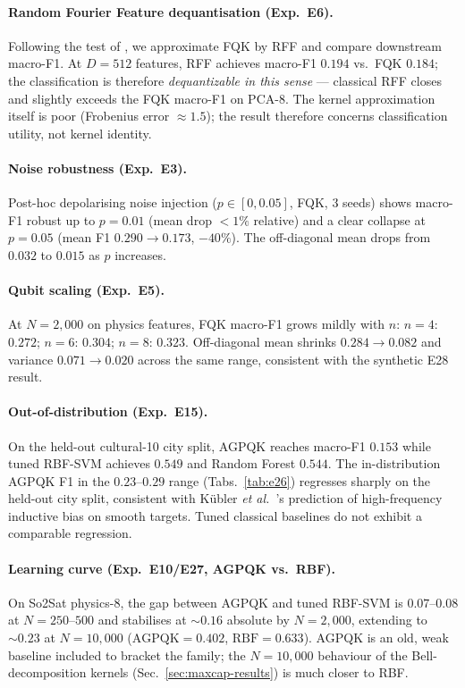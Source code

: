 \documentclass[pdflatex,sn-mathphys-num]{sn-jnl}
\theoremstyle{thmstyleone}
\theoremstyle{thmstyletwo}
\theoremstyle{thmstylethree}
\begin{document}
\paragraph{Random Fourier Feature dequantisation (Exp.\ E6).}
\label{sec:rff}
Following the test of \cite{huang2021}, we approximate FQK by RFF
\cite{rahimi2007} and compare downstream macro-F1. At $D=512$
features, RFF achieves macro-F1 $0.194$ vs.\ FQK $0.184$; the
classification is therefore \emph{dequantizable in this sense} ---
classical RFF closes and slightly exceeds the FQK macro-F1 on PCA-8.
The kernel approximation itself is poor (Frobenius error $\!\approx\!1.5$);
the result therefore concerns classification utility, not kernel
identity.

\paragraph{Noise robustness (Exp.\ E3).}
Post-hoc depolarising noise injection ($p\in [0,0.05]$, FQK, 3 seeds)
shows macro-F1 robust up to $p=0.01$ (mean drop $<\!1\%$ relative)
and a clear collapse at $p=0.05$ (mean F1 $0.290\to 0.173$,
$-40\%$). The off-diagonal mean drops from $0.032$ to $0.015$ as $p$
increases.

\paragraph{Qubit scaling (Exp.\ E5).}
At $N=2{,}000$ on physics features, FQK macro-F1 grows mildly with
$n$: $n=4$: $0.272$; $n=6$: $0.304$; $n=8$: $0.323$. Off-diagonal
mean shrinks $0.284\to 0.082$ and variance $0.071\to 0.020$
across the same range, consistent with the synthetic E28 result.

\paragraph{Out-of-distribution (Exp.\ E15).}
On the held-out cultural-10 city split, AGPQK reaches macro-F1
$0.153$ while tuned RBF-SVM achieves $0.549$ and Random Forest
$0.544$. The in-distribution AGPQK F1 in the $0.23$--$0.29$ range
(Tabs.~\ref{tab:e26}) regresses sharply on the held-out city split,
consistent with K{\"u}bler \emph{et al.}\ \cite{kubler2021}'s prediction
of high-frequency inductive bias on smooth targets. Tuned classical
baselines do not exhibit a comparable regression.

\paragraph{Learning curve (Exp.\ E10/E27, AGPQK vs.\ RBF).}
On So2Sat physics-8, the gap between AGPQK and tuned RBF-SVM is
$0.07$--$0.08$ at $N=250$--$500$ and stabilises at $\sim\!0.16$
absolute by $N=2{,}000$, extending to $\sim\!0.23$ at $N=10{,}000$
($\text{AGPQK}=0.402$, $\text{RBF}=0.633$). AGPQK is an old,
weak baseline included to bracket the family; the $N=10{,}000$
behaviour of the Bell-decomposition kernels (Sec.~\ref{sec:maxcap-results})
is much closer to RBF.
\end{document}

